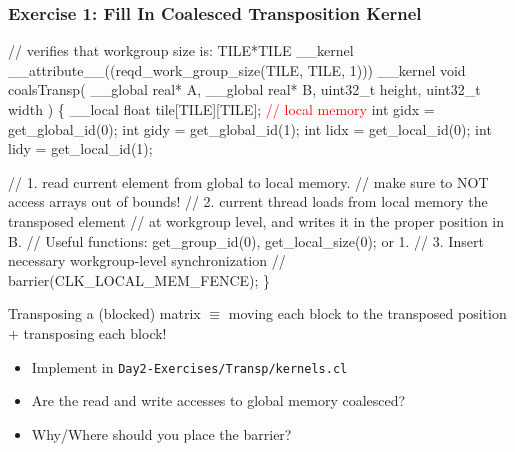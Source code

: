 \documentclass{beamer}
\newcommand{\red}[1]{\textcolor{Red}{{#1}}}
\newcommand{\emp}[1]{\textcolor{DikuRed}{ #1}}
\begin{document}
\begin{frame}[fragile,t]
  \frametitle{Exercise 1: Fill In Coalesced Transposition Kernel} 
\vspace{-1ex}
\begin{colorcode}[fontsize=\scriptsize]
// verifies that workgroup size is: TILE*TILE
__kernel __attribute__((reqd_work_group_size(TILE, TILE, 1)))
__kernel void coalsTransp( __global real* A, 
        __global real* B, uint32_t height, uint32_t width ) \{
  __local float tile[TILE][TILE];                    \red{// local memory}
  int gidx = get_global_id(0); int gidy = get_global_id(1);
  int lidx = get_local_id(0);  int lidy = get_local_id(1);

  // 1. read current element from global to local memory.
  //    make sure to NOT access arrays out of bounds!
  // 2. current thread loads from local memory the transposed element
  //    at workgroup level, and writes it in the proper position in B.
  //    Useful functions: get_group_id(0), get_local_size(0); or 1.
  // 3. Insert necessary workgroup-level synchronization
  //    barrier(CLK_LOCAL_MEM_FENCE);
\}
\end{colorcode}

Transposing a (blocked) matrix $\equiv$ moving each block to 
the transposed position $+$ transposing each block!\medskip

\pause
\begin{itemize}
    \item \emp{Implement in {\tt Day2-Exercises/Transp/kernels.cl}}
    \item Are the read and write accesses to global memory coalesced?
    \item Why/Where should you place the barrier?
\end{itemize}

\end{frame}

%
%
%
%
\end{document}
